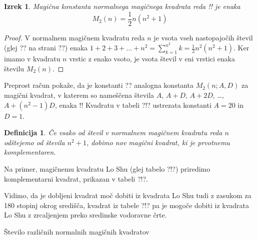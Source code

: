 \documentclass[a4paper,12pt]{article}
\newtheorem{Definicija}{Definicija}
\newtheorem{izrek}{Izrek}[section]
\begin{document}

\begin{izrek}
      Magična konstanta normalnega magičnega kvadrata reda !!
      je enaka
      \begin{equation}
         M_2(n) = \frac{1}{2} n(n^2+1)
      \end{equation}
\end{izrek}


\begin{proof}
      V normalnem magičnem kvadratu reda $n$ je vsota vseh nastopajočih
      števil (glej ?? na strani ??) enaka
      $1+2+3+\dots+n^2=\sum_{k=1}^{n^2}k=\frac{1}{2}n^2(n^2+1)$. Ker imamo
      v kvadratu $n$ vrstic z enako vsoto, je vsota števil v eni vrstici
      enaka številu $M_2(n)$. %
\end{proof}


Preprost račun pokaže, da je konstanti ?? analogna konstanta
$M_2(n;A,D)$ za magični kvadrat, v katerem so nameščena števila
$A$, $A+D$, $A+2D$, \dots, $A+(n^2-1)D$, enaka %
!!
Kvadratu v tabeli ?!? ustrezata konstanti $A=20$ in $D=1$.


\begin{Definicija}
         Če vsako od števil v normalnem magičnem kvadratu reda $n$ odštejemo
         od števila $n^2+1$, dobimo nov magični kvadrat, ki je prvotnemu
         \emph{komplementaren}.
\end{Definicija}

Na primer, magičnemu kvadratu Lo Shu (glej tabelo ?!?) priredimo
komplementarni kvadrat, prikazan v tabeli ?!?.
%

Vidimo, da je dobljeni kvadrat moč dobiti iz kvadrata Lo Shu tudi z zasukom za
180 stopinj okrog središča, kvadrat iz tabele ?!? pa je mogoče dobiti
iz kvadrata Lo Shu z zrcaljenjem preko sredinske vodoravne črte.

Število različnih normalnih magičnih kvadratov
\end{document}
